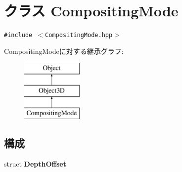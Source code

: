 \hypertarget{classm3g_1_1CompositingMode}{
\section{クラス CompositingMode}
\label{classm3g_1_1CompositingMode}
}
{\tt \#include $<$CompositingMode.hpp$>$}

CompositingModeに対する継承グラフ:\begin{figure}[H]
\begin{center}
\leavevmode
\includegraphics[height=3cm]{classm3g_1_1CompositingMode}
\end{center}
\end{figure}
\subsection*{構成}
\begin{CompactItemize}
\item 
struct \textbf{DepthOffset}
\end{CompactItemize}
